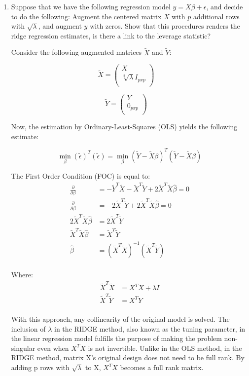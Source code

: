 \documentclass[12pt]{article}
\begin{document}
\begin{enumerate}
  \item Suppose that we have the following regression model  $y=X\beta +\epsilon$, and decide to do the following: Augment the centered matrix $X$ with $p$ additional rows with $\sqrt{\lambda}$, and augment $y$ with zeros. Show that this procedures renders the ridge regression estimates, is there a link to the leverage statistic?

Consider the following augmented matrices $\tilde{X}$ and $\tilde{Y}$:

$$
\tilde{X} =
\begin{pmatrix} 
X                         \\
\sqrt[2]{\lambda} I_{pxp}  \\
\end{pmatrix}
\quad
$$

$$
\tilde{Y} =
\begin{pmatrix} 
Y \\
0_{pxp} \\
\end{pmatrix}
\quad
$$

Now, the estimation by Ordinary-Least-Squares (OLS) yields the following estimate:

\[ \min_{\beta} (\tilde{\epsilon})^T(\tilde{\epsilon}) = \min_{\beta} (\tilde{Y}-\tilde{X}\beta)^T(\tilde{Y}-\tilde{X}\beta)\]

The First Order Condition (FOC) is equal to:
\begin{align*}
\frac{\partial}{\partial \beta} &= -\tilde{Y}^T\tilde{X} - \tilde{X}^T \tilde{Y} + 2 \tilde{X}^T \tilde{X}\hat\beta = 0 \\
\frac{\partial}{\partial \beta} &= -2\tilde{X}^T \tilde{Y} + 2 \tilde{X}^T \tilde{X}\hat\beta = 0 \\
2 \tilde{X}^T \tilde{X}\hat\beta &= 2\tilde{X}^T \tilde{Y}       \\
\tilde{X}^T \tilde{X}\hat\beta &= \tilde{X}^T \tilde{Y}       \\
\hat\beta &= (\tilde{X}^T \tilde{X})^{-1}(\tilde{X}^T \tilde{Y})     \\
\end{align*}

Where:
\begin{align*}
\tilde{X}^T\tilde{X} &= {X}^T{X} + \lambda I  \\
\tilde{X}^T\tilde{Y} &= {X}^T{Y}              \\
\end{align*}

With this approach, any collinearity of the original model is solved. The inclusion of $\lambda$ in the RIDGE method, also known as the tuning parameter, in the linear regression model fulfills the purpose of making the problem non-singular even when ${X}^T{X}$ is not invertible. Unlike in the OLS method, in the RIDGE method, matrix X's original design does not need to be full rank. By adding p rows with $\sqrt{\lambda}$ to X, ${X}^T{X}$ becomes a full rank matrix.


\end{enumerate}
\end{document}
